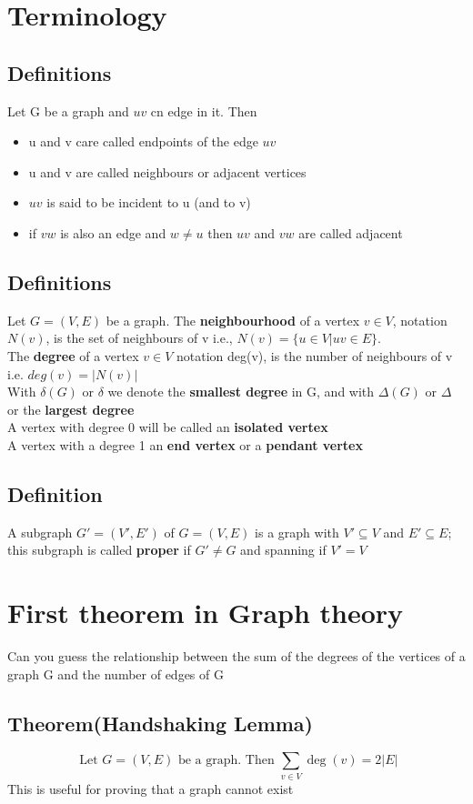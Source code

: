 \documentclass{article}[18pt]
\begin{document}
\section{Terminology}
\subsection{Definitions}
Let G be a graph and $uv$ cn edge in it. Then
\begin{itemize}
	\item u and v care called endpoints of the edge $uv$
	\item u and v are called neighbours or adjacent vertices
	\item $uv$ is said to be incident to u (and to v)
	\item if $vw$ is also an edge and $w\neq u$ then $uv$ and $vw$ are called adjacent
\end{itemize}
\subsection{Definitions}
Let $G=(V,E)$ be a graph. The \textbf{neighbourhood} of a vertex $v\in V$, notation $N(v)$, is the set of neighbours of v i.e., $N(v)=\{ u\in V| uv\in E\}$.\\
The \textbf{degree} of a vertex $v\in V$ notation deg(v), is the number of neighbours of v i.e. $deg(v)=|N(v)|$\\
With $\delta(G)$ or $\delta$ we denote the \textbf{smallest degree} in G, and with $\Delta(G)$ or $\Delta$ or the \textbf{largest degree}\\
A vertex with degree 0 will be called an \textbf{isolated vertex}\\
A vertex with a degree 1 an \textbf{end vertex} or a \textbf{pendant vertex}
\subsection{Definition}
A subgraph $G'=(V',E')$ of $G=(V,E)$ is a graph with $V'\subseteq V$ and $E'\subseteq E$; this subgraph is called \textbf{proper} if $G'\neq G$ and spanning if $V'=V$
\section{First theorem in Graph theory}
Can you guess the relationship between the sum of the degrees of the vertices of a graph G and the number of edges of G
\subsection{Theorem(Handshaking Lemma)}
$$\text { Let } G = ( V , E ) \text { be a graph. Then } \sum _ { v \in V } \operatorname { deg } ( v ) = 2 | E |$$
This is useful for proving that a graph cannot exist
\end{document}
